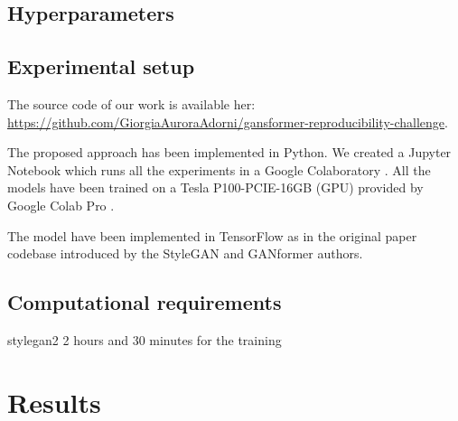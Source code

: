 \documentclass{article}
\begin{document}
	

	\subsection{Hyperparameters}
	
	\subsection{Experimental setup}
	
	The source code of our work is available her: 
	\url{https://github.com/GiorgiaAuroraAdorni/gansformer-reproducibility-challenge}.
	 
	 The proposed approach has been implemented in Python. We created a Jupyter Notebook \cite{...}  
	 which runs all the experiments in a Google Colaboratory \cite{...}.
	 All the models have been trained on a Tesla P100-PCIE-16GB (GPU) provided by Google 
	 Colab Pro \cite{...}.
	
	The model have been implemented in TensorFlow \cite{...} as in the original paper codebase 
	introduced by the StyleGAN \cite{...} and GANformer \cite{...} authors.
	
	\subsection{Computational requirements}
	
	stylegan2 2 hours and 30 minutes for the training 
	

	\section{Results}
	
%	
%	
	
\end{document}

